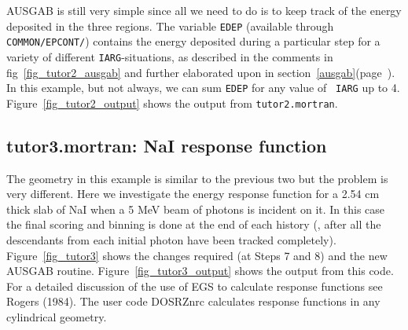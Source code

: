 \begin{latexonly}

\end{latexonly}
\begin{htmlonly}
\clearpage

\clearpage
\end{htmlonly}

AUSGAB is still very simple since all we need to do is to keep track
of the energy deposited in the three regions.  The variable {\tt EDEP}
(available through {\tt COMMON/EPCONT/}) contains the energy deposited
during a particular step for a variety of different {\tt IARG}-situations,
as described in the comments in fig~\ref{fig_tutor2_ausgab} and further
elaborated upon in section~\ref{ausgab}(page~\pageref{ausgab}).  In this
example, but not always, we can sum {\tt EDEP} for any value of {\tt
IARG} up to 4.  Figure~\ref{fig_tutor2_output} shows the output from
{\tt tutor2.mortran}.

\newpage

\begin{latexonly}
%

\end{latexonly}
\clearpage
\begin{htmlonly}
\clearpage

\clearpage
\end{htmlonly}

\subsection{tutor3.mortran: NaI response function}


The geometry in  this  example is similar to the previous two but the
problem is very different.  Here we investigate the energy response
function for a 2.54 cm thick slab of NaI when a 5 MeV beam of photons
is incident on it.  In  this case the final scoring and binning is
done at the end of each history (\ie , after all the descendants
from each initial photon have been tracked completely).
Figure~\ref{fig_tutor3}
shows the changes required (at Steps 7 and 8) and the new AUSGAB
routine. Figure~\ref{fig_tutor3_output} shows the output from this code.
For a detailed discussion of the use of EGS to calculate response functions
see Rogers (1984)\cite{Ro82}.  The user code DOSRZnrc calculates response
functions in any cylindrical geometry\cite{Ro00}.




